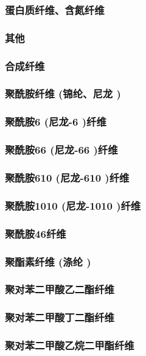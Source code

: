 \documentclass[UTF8]{../../ApplicationUniverse}
\begin{document}
    \subsubsection{蛋白质纤维、含氮纤维}
    \subsubsection{其他}
\subsubsection{合成纤维}
    \subsubsection{聚酰胺纤维 (锦纶、尼龙 )}
        \subsubsection{聚酰胺6 (尼龙-6 )纤维}
        \subsubsection{聚酰胺66 (尼龙-66 )纤维}
        \subsubsection{聚酰胺610 (尼龙-610 )纤维}
        \subsubsection{聚酰胺1010 (尼龙-1010 )纤维}
        \subsubsection{聚酰胺46纤维}
    \subsubsection{聚酯素纤维 (涤纶 )}
        \subsubsection{聚对苯二甲酸乙二酯纤维}
        \subsubsection{聚对苯二甲酸丁二酯纤维}
        \subsubsection{聚对苯二甲酸乙烷二甲酯纤维}
\end{document}
